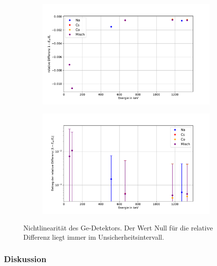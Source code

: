 \documentclass[
	a4paper,
	12pt,
	pagesize,
	ngerman
]{scrartcl}
\begin{document}
\begin{figure}[H]
		\centering
		\begin{subfigure}[t]{0.8\textwidth}
			\centering
			\includegraphics[width= \linewidth]{img/diff_ge.pdf}
		\end{subfigure}
		\begin{subfigure}[t]{0.8\textwidth}
			\centering
			\includegraphics[width= \linewidth]{img/diff_ge_log.pdf}
		\end{subfigure}
		\caption{Nichtlinearität des Ge-Detektors.
		Der Wert Null für die relative Differenz liegt immer im Unsicherheitsintervall.
		}
		\label{fg_diff_ge}
	\end{figure}


	\subsubsection{Diskussion}
\end{document}

